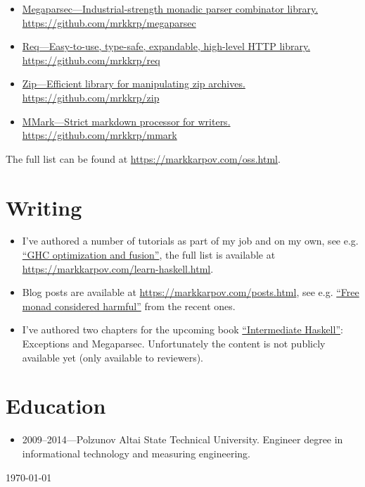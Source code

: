 \documentclass[a4paper,12pt]{article}
\begin{document}
\begin{itemize}[noitemsep]
\item \href{https://github.com/mrkkrp/megaparsec}
  {Megaparsec---Industrial-strength monadic parser combinator library.
    \newline
    https://github.com/mrkkrp/megaparsec}
\item \href{https://github.com/mrkkrp/req}
  {Req---Easy-to-use, type-safe, expandable, high-level HTTP library.
    \newline
    https://github.com/mrkkrp/req}
\item \href{https://github.com/mrkkrp/zip}
  {Zip---Efficient library for manipulating zip archives.
    \newline
    https://github.com/mrkkrp/zip}
\item \href{https://github.com/mrkkrp/mmark}
  {MMark---Strict markdown processor for writers.
    \newline
    https://github.com/mrkkrp/mmark}
\end{itemize}

The full list can be found at \href{https://markkarpov.com/oss.html}{https://markkarpov.com/oss.html}.

\section*{Writing}

\begin{itemize}[noitemsep]
\item I've authored a number of tutorials as part of my job and on my own,
  see e.g.
  \href{https://www.stackbuilders.com/tutorials/haskell/ghc-optimization-and-fusion/}{“GHC
    optimization and fusion”}, the full list is available at \\
  \href{https://markkarpov.com/learn-haskell.html}{https://markkarpov.com/learn-haskell.html}.
\item Blog posts are available at
  \href{https://markkarpov.com/posts.html}{https://markkarpov.com/posts.html},
  see e.g.
  \href{https://markkarpov.com/post/free-monad-considered-harmful.html}{“Free
    monad considered harmful”} from the recent ones.
\item I've authored two chapters for the upcoming book
  \href{https://intermediatehaskell.com/}{“Intermediate Haskell”}:
  Exceptions and Megaparsec. Unfortunately the content is not publicly
  available yet (only available to reviewers).
\end{itemize}

\section*{Education}

\begin{itemize}[noitemsep]
\item 2009--2014---Polzunov Altai State Technical University. Engineer
  degree in informational technology and measuring engineering.
\end{itemize}

\begin{flushright}
  \today
\end{flushright}
\end{document}
